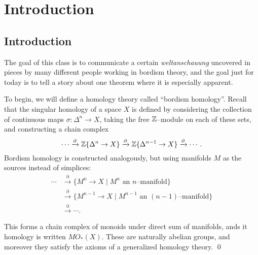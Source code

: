 
\setcounter{chapter}{-1}
\chapter{Introduction}

\section{Introduction}\label{IntroductionSection}

The goal of this class is to communicate a certain \textit{weltanschauung} uncovered in pieces by many different people working in bordism theory, and the goal just for today is to tell a story about one theorem where it is especially apparent.

To begin, we will define a homology theory called ``bordism homology''.  Recall that the singular homology of a space $X$ is defined by considering the collection of continuous maps $\sigma: \Delta^n \to X$, taking the free $\mathbb Z$--module on each of these sets, and constructing a chain complex \[\cdots \xrightarrow{\partial} \mathbb Z\{\Delta^n \to X\} \xrightarrow{\partial} \mathbb Z\{\Delta^{n-1} \to X\} \xrightarrow{\partial} \cdots.\]  Bordism homology is constructed analogously, but using manifolds $M$ as the sources instead of simplices:
\begin{align*}
\cdots & \xrightarrow{\partial} \{M^n \to X \mid \text{$M^n$ an $n$--manifold}\} \\
& \xrightarrow{\partial} \{M^{n-1} \to X \mid \text{$M^{n-1}$ an $(n-1)$--manifold}\} \\
& \xrightarrow{\partial} \cdots.
\end{align*}

\begin{lemma}
This forms a chain complex of monoids under direct sum of manifolds, ands it homology is written $MO_*(X)$.  These are naturally abelian groups, and moreover they satisfy the axioms of a generalized homology theory. \qed
\end{lemma}

